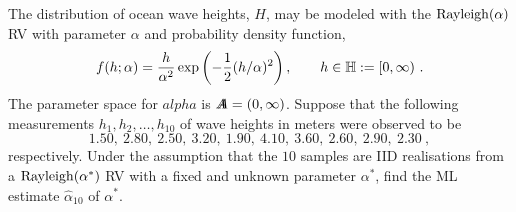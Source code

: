 \begin{example}\label{LW:RayleighOceanHeightsMLE}
The distribution of ocean wave heights, $H$, may be modeled with the ${\rm Rayleigh}(\alpha)$ RV with parameter $\alpha$ and probability density function,
\[
f(h;\alpha) = \frac{h}{\alpha^2} \exp \left({-\frac{1}{2} (h/\alpha)^2}\right), \qquad h \in \mathbb{H} := [0,\infty) \ .
\]
The parameter space for $alpha$ is ${A}\mspace{-11 mu}{A} = (0,\infty)$.  Suppose that the following measurements $h_1,h_2,\ldots,h_{10}$ of wave heights in meters were observed to be
\[
1.50, \  2.80, \ 2.50, \ 3.20, \ 1.90, \ 4.10, \ 3.60, \ 2.60, \ 2.90, \ 2.30 \ ,
\]
respectively.  Under the assumption that the $10$ samples are IID realisations from a ${\rm Rayleigh}(\alpha^*)$ RV with a fixed and unknown parameter $\alpha^*$, find the ML estimate $\widehat{\alpha}_{10}$ of $\alpha^*$.


\end{example}
